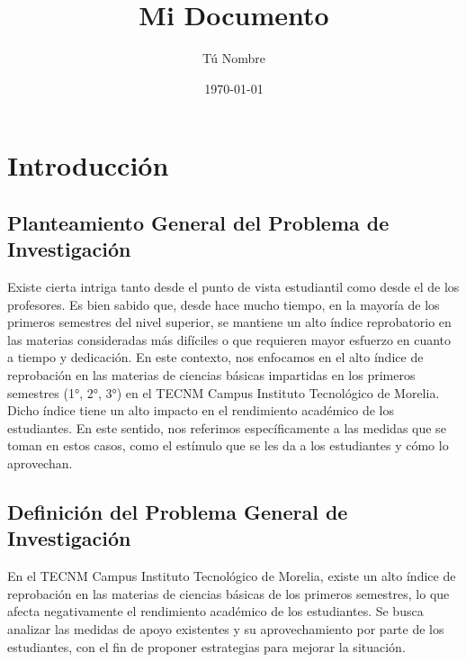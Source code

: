 \documentclass{article}
\title{Mi Documento}
\author{Tú Nombre}
\date{\today}
\begin{document}


\tableofcontents
\clearpage

\section{Introducción}

\subsection{Planteamiento General del Problema de Investigación }


Existe cierta intriga tanto desde el punto de vista estudiantil como desde el de los profesores.
Es bien sabido que, desde hace mucho tiempo, en la mayoría de los primeros semestres del nivel superior,
se mantiene un alto índice reprobatorio en las materias consideradas más difíciles o que requieren mayor
 esfuerzo en cuanto a tiempo y dedicación. En este contexto, nos enfocamos en el alto índice de reprobación 
 en las materias de ciencias básicas impartidas en los primeros semestres (1°, 2°, 3°) en el TECNM Campus Instituto Tecnológico
  de Morelia. Dicho índice tiene un alto impacto en el rendimiento académico de los estudiantes. En este sentido, nos referimos
   específicamente a las medidas que se toman en estos casos, como el estímulo que se les da a los estudiantes y cómo lo aprovechan.

\subsection{Definición del Problema General de Investigación}

En el TECNM Campus Instituto Tecnológico de Morelia, existe un alto índice de reprobación en las materias de ciencias básicas de los
 primeros semestres, lo que afecta negativamente el rendimiento académico de los estudiantes. Se busca analizar las medidas de apoyo
  existentes y su aprovechamiento por parte de los estudiantes, con el fin de proponer estrategias para mejorar la situación.
\end{document}
